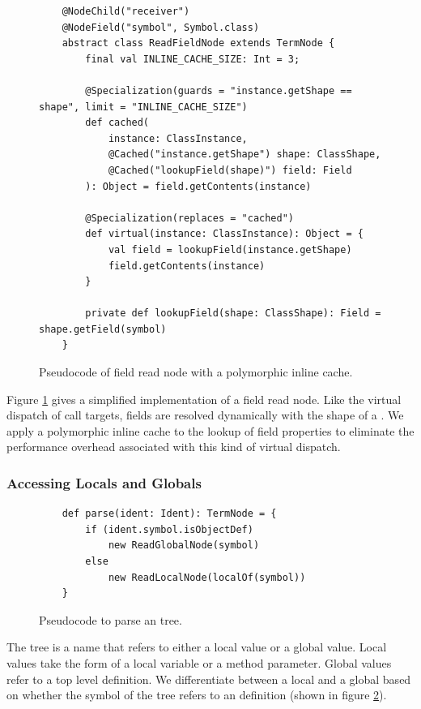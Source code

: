 \begin{figure}[!htb]
	\begin{verbatim}
	@NodeChild("receiver")
	@NodeField("symbol", Symbol.class)
	abstract class ReadFieldNode extends TermNode {
		final val INLINE_CACHE_SIZE: Int = 3;
			
		@Specialization(guards = "instance.getShape == shape", limit = "INLINE_CACHE_SIZE")
		def cached(
			instance: ClassInstance,
			@Cached("instance.getShape") shape: ClassShape,
			@Cached("lookupField(shape)") field: Field
		): Object = field.getContents(instance)
			
		@Specialization(replaces = "cached")
		def virtual(instance: ClassInstance): Object = {
			val field = lookupField(instance.getShape)
			field.getContents(instance)
		}
	
		private def lookupField(shape: ClassShape): Field = shape.getField(symbol)
	}
	\end{verbatim}
	\caption{Pseudocode of field read node with a polymorphic inline cache.}
	\label{impl:field-read-node}
\end{figure}

Figure \ref{impl:field-read-node} gives a simplified implementation of a field read node.
Like the virtual dispatch of call targets, fields are resolved dynamically with the shape of a .
We apply a polymorphic inline cache to the lookup of field properties to eliminate the performance overhead associated with this kind of virtual dispatch.

\subsubsection*{Accessing Locals and Globals}

\begin{figure}[!htb]
	\begin{verbatim}
	def parse(ident: Ident): TermNode = {
		if (ident.symbol.isObjectDef)
			new ReadGlobalNode(symbol)
		else 
			new ReadLocalNode(localOf(symbol))
	}
	\end{verbatim}
	\caption{Pseudocode to parse an  tree.}
	\label{impl:parse-ident}
\end{figure}

The  tree is a name that refers to either a local value or a global value.
Local values take the form of a local variable or a method parameter.
Global values refer to a top level  definition.
We differentiate between a local and a global based on whether the symbol of the  tree refers to an  definition (shown in figure \ref{impl:parse-ident}).

